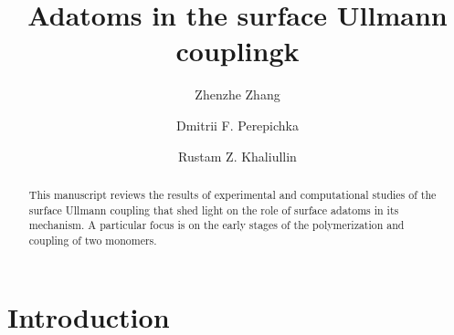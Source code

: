 \documentclass[%
 reprint,
 amsmath,amssymb,
 aps,
prb,
]{revtex4-2}
\begin{document}

\title{Adatoms in the surface Ullmann couplingk}%

\author{Zhenzhe Zhang}
\author{Dmitrii F. Perepichka}%
\author{Rustam Z. Khaliullin}
%


\begin{abstract}
This manuscript reviews the results of experimental and computational studies of the surface Ullmann coupling that shed light on the role of surface adatoms in its mechanism. A particular focus is on the early stages of the polymerization and coupling of two monomers.
\end{abstract}

\maketitle


\section{\label{sec:level1}Introduction\protect\\ %
}
\end{document}
